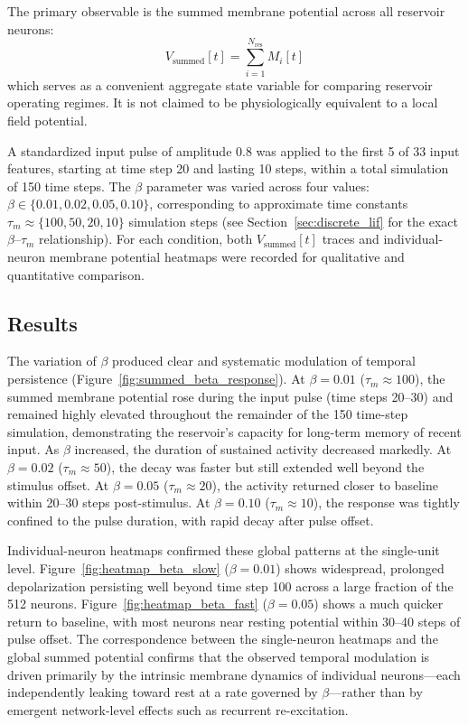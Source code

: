 The primary observable is the summed membrane potential across all reservoir neurons:
\begin{equation}
    V_{\text{summed}}[t] = \sum_{i=1}^{N_{\text{res}}} M_i[t]
    \label{eq:v_summed}
\end{equation}
which serves as a convenient aggregate state variable for comparing reservoir operating regimes. It is not claimed to be physiologically equivalent to a local field potential.

A standardized input pulse of amplitude 0.8 was applied to the first 5 of 33 input features, starting at time step 20 and lasting 10 steps, within a total simulation of 150 time steps. The $\beta$ parameter was varied across four values: $\beta \in \{0.01, 0.02, 0.05, 0.10\}$, corresponding to approximate time constants $\tau_m \approx \{100, 50, 20, 10\}$ simulation steps (see Section~\ref{sec:discrete_lif} for the exact $\beta$--$\tau_m$ relationship). For each condition, both $V_{\text{summed}}[t]$ traces and individual-neuron membrane potential heatmaps were recorded for qualitative and quantitative comparison.

\subsection{Results}

The variation of $\beta$ produced clear and systematic modulation of temporal persistence (Figure~\ref{fig:summed_beta_response}). At $\beta = 0.01$ ($\tau_m \approx 100$), the summed membrane potential rose during the input pulse (time steps 20--30) and remained highly elevated throughout the remainder of the 150 time-step simulation, demonstrating the reservoir's capacity for long-term memory of recent input. As $\beta$ increased, the duration of sustained activity decreased markedly. At $\beta = 0.02$ ($\tau_m \approx 50$), the decay was faster but still extended well beyond the stimulus offset. At $\beta = 0.05$ ($\tau_m \approx 20$), the activity returned closer to baseline within 20--30 steps post-stimulus. At $\beta = 0.10$ ($\tau_m \approx 10$), the response was tightly confined to the pulse duration, with rapid decay after pulse offset.

Individual-neuron heatmaps confirmed these global patterns at the single-unit level. Figure~\ref{fig:heatmap_beta_slow} ($\beta = 0.01$) shows widespread, prolonged depolarization persisting well beyond time step 100 across a large fraction of the 512 neurons. Figure~\ref{fig:heatmap_beta_fast} ($\beta = 0.05$) shows a much quicker return to baseline, with most neurons near resting potential within 30--40 steps of pulse offset. The correspondence between the single-neuron heatmaps and the global summed potential confirms that the observed temporal modulation is driven primarily by the intrinsic membrane dynamics of individual neurons---each independently leaking toward rest at a rate governed by $\beta$---rather than by emergent network-level effects such as recurrent re-excitation.

